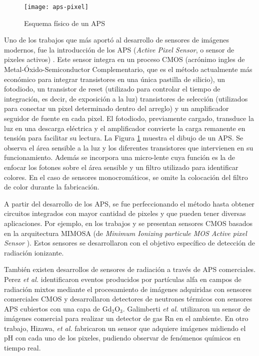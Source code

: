 \begin{figure}[t]
	\centering
	\texttt{[image: aps-pixel]}
	\caption{Esquema físico de un APS\cite{Turchetta2019}}
	\label{fig:pix}
\end{figure}

Uno de los trabajos que más aportó al desarrollo de sensores de imágenes modernos, fue la introducción de los APS ({\it Active Pixel Sensor}, o sensor de pixeles activos) \cite{Mendis1994}. Este sensor integra en un proceso CMOS (acrónimo ingles de Metal-Óxido-Semiconductor Complementario, que es el método actualmente más económico para integrar transistores en una única pastilla de silicio), un fotodiodo, un transistor de reset (utilizado para controlar el tiempo de integración, es decir, de exposición a la luz) transistores de selección (utilizados para conectar un pixel determinado dentro del arreglo) y un amplificador seguidor de fuente en cada pixel\cite{Turchetta2019}. El fotodiodo, previamente cargado, transduce la luz en una descarga eléctrica y el amplificador convierte la carga remanente en tensión para facilitar su lectura. La Figura \ref{fig:pix} muestra el dibujo de un APS. Se observa el área sensible a la luz y los diferentes transistores que intervienen en su funcionamiento. Además se incorpora una micro-lente cuya función es la de enfocar los fotones sobre el área sensible y un filtro utilizado para identificar colores. En el caso de sensores monocromáticos, se omite la colocación del filtro de color durante la fabricación.%

A partir del desarrollo de los APS, se fue perfeccionando el método hasta obtener circuitos integrados con mayor cantidad de pixeles y que pueden tener diversas aplicaciones. Por ejemplo, en los trabajos \cite{Hu-Guo2009} y \cite{Baudot2009} se presentan sensores CMOS basados en la arquitectura MIMOSA (de {\it Minimum Ionizing particule MOS Active pixel Sensor}%
). Estos sensores se desarrollaron con el objetivo específico de detección de radiación ionizante.%

También existen desarrollos de sensores de radiación a través de APS comerciales. Perez {\it et al.} identificaron eventos producidos por partículas alfa en campos de radiación mixtos mediante el procesamiento de imágenes adquiridas con sensores comerciales CMOS\cite{Perez2016} y desarrollaron detectores de neutrones térmicos con sensores APS cubiertos con una capa de Gd$_2$O$_3$\cite{Perez2018Thermal}. Galimberti {\it et al.} utilizaron un sensor de imágenes comercial para realizar un detector de gas Rn en el ambiente\cite{Galimberti2018}. En otro trabajo, Hizawa, {\it et al.} fabricaron un sensor que adquiere imágenes midiendo el pH con cada uno de los pixeles\cite{Hizawa2007}, pudiendo observar de fenómenos químicos en tiempo real.%

